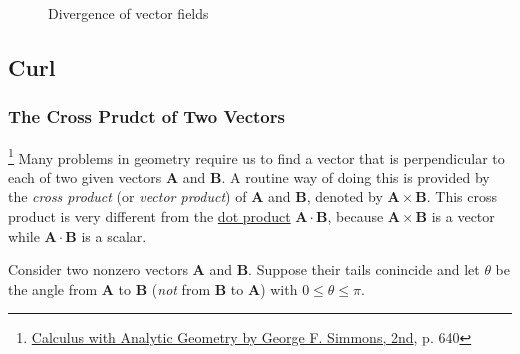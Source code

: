 \begin{figure}[H]
\begin{subfigure}{.24\textwidth}
\begin{tikzpicture}
        \end{tikzpicture}
    \end{subfigure}
    \begin{subfigure}{.24\textwidth}
        \centering
    \end{subfigure}
    \caption{Divergence of vector fields}
    \label{fig:divergence-examples}
\end{figure}

\subsection{Curl}

\subsubsection{The Cross Prudct of Two Vectors}

\footnote{\href{https://trello.com/c/byu9Pyy8}{Calculus with Analytic Geometry by George F. Simmons, 2nd}, p. 640} Many
problems in geometry require us to find a vector that is perpendicular to each of two given vectors $\boldsymbol{A}$ and
$\boldsymbol{B}$. A routine way of doing this is provided by the \textit{cross product} (or \textit{vector product}) of
$\boldsymbol{A}$ and $\boldsymbol{B}$, denoted by $\boldsymbol{A} \times \boldsymbol{B}$. This cross product is very
different from the \hyperref[eq:divergence-dot-product]{dot product} $\boldsymbol{A} \cdot \boldsymbol{B}$, because
$\boldsymbol{A} \times \boldsymbol{B}$ is a vector while $\boldsymbol{A} \cdot \boldsymbol{B}$ is a scalar.

Consider two nonzero vectors $\boldsymbol{A}$ and $\boldsymbol{B}$. Suppose their tails conincide and let $\theta$ be
the angle from $\boldsymbol{A}$ to $\boldsymbol{B}$ (\textit{not} from $\boldsymbol{B}$ to $\boldsymbol{A}$) with
$0 \le \theta \le \pi$.

